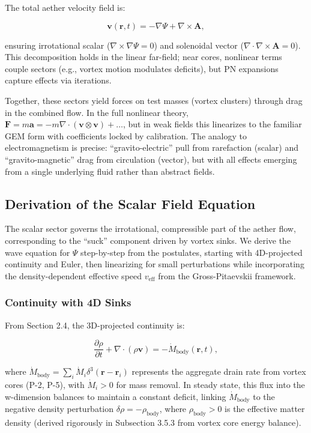 \documentclass{article}
\begin{document}
The total aether velocity field is:

\[
\mathbf{v}(\mathbf{r}, t) = -\nabla \Psi + \nabla \times \mathbf{A},
\]

ensuring irrotational scalar ($\nabla \times \nabla \Psi = 0$) and solenoidal vector ($\nabla \cdot \nabla \times \mathbf{A} = 0$). This decomposition holds in the linear far-field; near cores, nonlinear terms couple sectors (e.g., vortex motion modulates deficits), but PN expansions capture effects via iterations.

Together, these sectors yield forces on test masses (vortex clusters) through drag in the combined flow. In the full nonlinear theory, $\mathbf{F} = m \mathbf{a} = -m \nabla \cdot (\mathbf{v} \otimes \mathbf{v}) + \dots$, but in weak fields this linearizes to the familiar GEM form with coefficients locked by calibration. The analogy to electromagnetism is precise: ``gravito-electric'' pull from rarefaction (scalar) and ``gravito-magnetic'' drag from circulation (vector), but with all effects emerging from a single underlying fluid rather than abstract fields.

\subsection{Derivation of the Scalar Field Equation}

The scalar sector governs the irrotational, compressible part of the aether flow, corresponding to the ``suck'' component driven by vortex sinks. We derive the wave equation for $\Psi$ step-by-step from the postulates, starting with 4D-projected continuity and Euler, then linearizing for small perturbations while incorporating the density-dependent effective speed $v_{\text{eff}}$ from the Gross-Pitaevskii framework.

\subsubsection{Continuity with 4D Sinks}

From Section 2.4, the 3D-projected continuity is:

\[
\frac{\partial \rho}{\partial t} + \nabla \cdot (\rho \mathbf{v}) = -\dot{M}_{\text{body}}(\mathbf{r}, t),
\]

where $\dot{M}_{\text{body}} = \sum_i \dot{M}_i \delta^3(\mathbf{r} - \mathbf{r}_i)$ represents the aggregate drain rate from vortex cores (P-2, P-5), with $\dot{M}_i > 0$ for mass removal. In steady state, this flux into the w-dimension balances to maintain a constant deficit, linking $\dot{M}_{\text{body}}$ to the negative density perturbation $\delta \rho = -\rho_{\text{body}}$, where $\rho_{\text{body}} > 0$ is the effective matter density (derived rigorously in Subsection 3.5.3 from vortex core energy balance).
\end{document}
